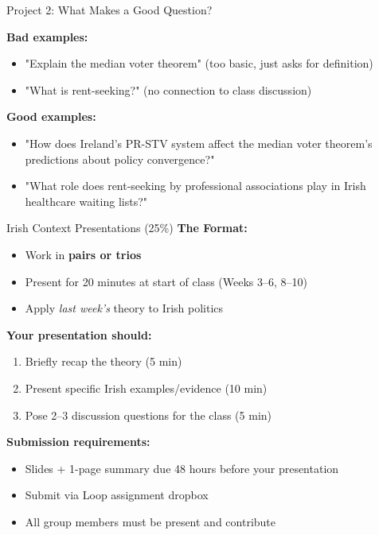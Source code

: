\documentclass[10pt]{beamer}
\begin{document}
\begin{frame}{Project 2: What Makes a Good Question?}

\textbf{Bad examples:}
\begin{itemize}
\item "Explain the median voter theorem" (too basic, just asks for definition)
\item "What is rent-seeking?" (no connection to class discussion)
\end{itemize}


\textbf{Good examples:}
\begin{itemize}
\item "How does Ireland's PR-STV system affect the median voter theorem's predictions about policy convergence?"
\item "What role does rent-seeking by professional associations play in Irish healthcare waiting lists?"
\end{itemize}
\end{frame}

\begin{frame}{Irish Context Presentations (25\%)}
\textbf{The Format:}
\begin{itemize}
\item Work in \textbf{pairs or trios}
\item Present for 20 minutes at start of class (Weeks 3--6, 8--10)
\item Apply \textit{last week's} theory to Irish politics
\end{itemize}

\textbf{Your presentation should:}
\begin{enumerate}
\item Briefly recap the theory (5 min)
\item Present specific Irish examples/evidence (10 min)
\item Pose 2--3 discussion questions for the class (5 min)
\end{enumerate}

\textbf{Submission requirements:}
\begin{itemize}
\item Slides + 1-page summary due 48 hours before your presentation
\item Submit via Loop assignment dropbox
\item All group members must be present and contribute
\end{itemize}
\end{frame}
\end{document}
